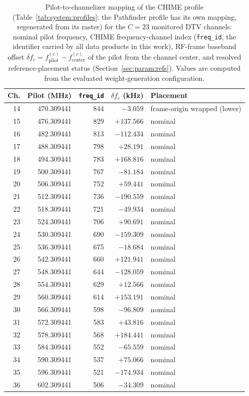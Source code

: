 \begin{table}[t]
\centering
\small
\caption[Pilot-to-channelizer mapping for the 23 monitored channels]{Pilot-to-channelizer mapping of the CHIME profile (Table~\ref{tab:system:profiles}; the Pathfinder profile has its own mapping, regenerated from its raster) for the $C = 23$ monitored DTV channels: nominal pilot frequency, CHIME frequency-channel index (\texttt{freq\_id}, the identifier carried by all data products in this work), RF-frame baseband offset $\delta\!f_c = f_{\text{pilot}}^{(c)} - f_{\text{center}}^{(c)}$ of the pilot from the channel center, and resolved reference-placement status (Section~\ref{sec:param:refs}). Values are computed from the evaluated weight-generation configuration.}
\label{tab:channels}
\begin{tabular}{rrrrl}
\toprule
Ch. & Pilot (MHz) & \texttt{freq\_id} & $\delta\!f_c$ (kHz) & Placement \\
\midrule
14 & 470.309441 & 844 & $-3.059$ & frame-origin wrapped (lower) \\
15 & 476.309441 & 829 & $+137.566$ & nominal \\
16 & 482.309441 & 813 & $-112.434$ & nominal \\
17 & 488.309441 & 798 & $+28.191$ & nominal \\
18 & 494.309441 & 783 & $+168.816$ & nominal \\
19 & 500.309441 & 767 & $-81.184$ & nominal \\
20 & 506.309441 & 752 & $+59.441$ & nominal \\
21 & 512.309441 & 736 & $-190.559$ & nominal \\
22 & 518.309441 & 721 & $-49.934$ & nominal \\
23 & 524.309441 & 706 & $+90.691$ & nominal \\
24 & 530.309441 & 690 & $-159.309$ & nominal \\
25 & 536.309441 & 675 & $-18.684$ & nominal \\
26 & 542.309441 & 660 & $+121.941$ & nominal \\
27 & 548.309441 & 644 & $-128.059$ & nominal \\
28 & 554.309441 & 629 & $+12.566$ & nominal \\
29 & 560.309441 & 614 & $+153.191$ & nominal \\
30 & 566.309441 & 598 & $-96.809$ & nominal \\
31 & 572.309441 & 583 & $+43.816$ & nominal \\
32 & 578.309441 & 568 & $+184.441$ & nominal \\
33 & 584.309441 & 552 & $-65.559$ & nominal \\
34 & 590.309441 & 537 & $+75.066$ & nominal \\
35 & 596.309441 & 521 & $-174.934$ & nominal \\
36 & 602.309441 & 506 & $-34.309$ & nominal \\
\bottomrule
\end{tabular}
\end{table}

